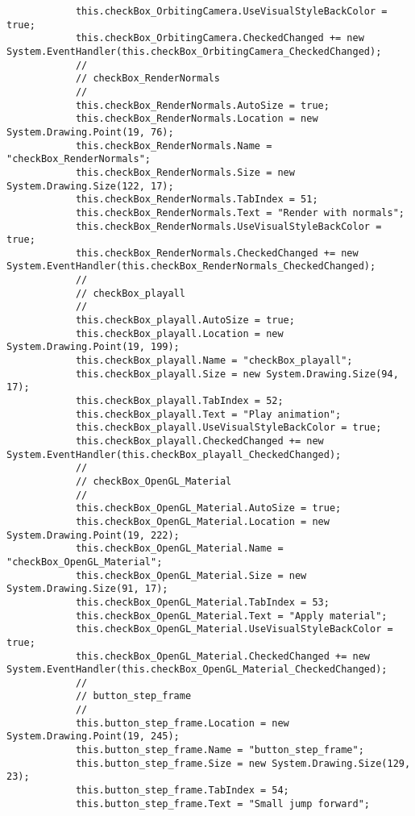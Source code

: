 \begin{scriptsize}
\begin{verbatim}
            this.checkBox_OrbitingCamera.UseVisualStyleBackColor = true;
            this.checkBox_OrbitingCamera.CheckedChanged += new System.EventHandler(this.checkBox_OrbitingCamera_CheckedChanged);
            // 
            // checkBox_RenderNormals
            // 
            this.checkBox_RenderNormals.AutoSize = true;
            this.checkBox_RenderNormals.Location = new System.Drawing.Point(19, 76);
            this.checkBox_RenderNormals.Name = "checkBox_RenderNormals";
            this.checkBox_RenderNormals.Size = new System.Drawing.Size(122, 17);
            this.checkBox_RenderNormals.TabIndex = 51;
            this.checkBox_RenderNormals.Text = "Render with normals";
            this.checkBox_RenderNormals.UseVisualStyleBackColor = true;
            this.checkBox_RenderNormals.CheckedChanged += new System.EventHandler(this.checkBox_RenderNormals_CheckedChanged);
            // 
            // checkBox_playall
            // 
            this.checkBox_playall.AutoSize = true;
            this.checkBox_playall.Location = new System.Drawing.Point(19, 199);
            this.checkBox_playall.Name = "checkBox_playall";
            this.checkBox_playall.Size = new System.Drawing.Size(94, 17);
            this.checkBox_playall.TabIndex = 52;
            this.checkBox_playall.Text = "Play animation";
            this.checkBox_playall.UseVisualStyleBackColor = true;
            this.checkBox_playall.CheckedChanged += new System.EventHandler(this.checkBox_playall_CheckedChanged);
            // 
            // checkBox_OpenGL_Material
            // 
            this.checkBox_OpenGL_Material.AutoSize = true;
            this.checkBox_OpenGL_Material.Location = new System.Drawing.Point(19, 222);
            this.checkBox_OpenGL_Material.Name = "checkBox_OpenGL_Material";
            this.checkBox_OpenGL_Material.Size = new System.Drawing.Size(91, 17);
            this.checkBox_OpenGL_Material.TabIndex = 53;
            this.checkBox_OpenGL_Material.Text = "Apply material";
            this.checkBox_OpenGL_Material.UseVisualStyleBackColor = true;
            this.checkBox_OpenGL_Material.CheckedChanged += new System.EventHandler(this.checkBox_OpenGL_Material_CheckedChanged);
            // 
            // button_step_frame
            // 
            this.button_step_frame.Location = new System.Drawing.Point(19, 245);
            this.button_step_frame.Name = "button_step_frame";
            this.button_step_frame.Size = new System.Drawing.Size(129, 23);
            this.button_step_frame.TabIndex = 54;
            this.button_step_frame.Text = "Small jump forward";

\end{verbatim}
\end{scriptsize}
